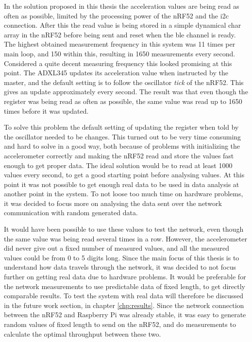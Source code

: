 In the solution proposed in this thesis the acceleration values are being read as often as possible, limited by the processing power of the \gls{nRF52} and the \gls{i2c} connection. After this the read value is being stored in a simple dynamical char array in the \gls{nRF52} before being sent and reset when the \gls{ble} channel is ready. The highest obtained measurement frequency in this system was 11 times per main loop, and 150 within this, resulting in 1650 measurements every second. Considered a quite decent measuring frequency this looked promising at this point. The \gls{ADXL345} updates its acceleration value when instructed by the master, and the default setting is to follow the oscillator \textit{tick} of the \gls{nRF52}. This gives an update approximately every second. The result was that even though the register was being read as often as possible, the same value was read up to 1650 times before it was updated. 

To solve this problem the default setting of updating the register when told by the oscillator needed to be changes. This turned out to be very time consuming and hard to solve in a good way, both because of problems with initializing the accelerometer correctly and making the nRF52 read and store the values fast enough to get proper data. The ideal solution would be to read at least 1000 values every second, to get a good starting point before analysing values. At this point it was not possible to get enough real data to be used in data analysis at another point in the system. To not loose too much time on hardware problems, it was decided to focus more on analysing the data sent over the network communication with random generated data. 

It would have been possible to use these values to test the network, even though the same value was being read several times in a row. However, the accelerometer did never give out a fixed number of measured values, and all the measured values could be from 0 to 5 digits long. Since the main focus of this thesis is to understand how data travels through the network, it was decided to not focus further on getting real data due to hardware problems. It would be preferable for the network measurements to use predictable data of fixed length, to get directly comparable results. To test the system with real data will therefore be discussed in the future work section, in chapter \ref{chp:results}. Since the network connection between the \gls{nRF52} and \gls{Raspberry Pi} was already stable, it was easy to generate random values of fixed length to send on the \gls{nRF52}, and do measurements to calculate the optimal throughput between these two. 

